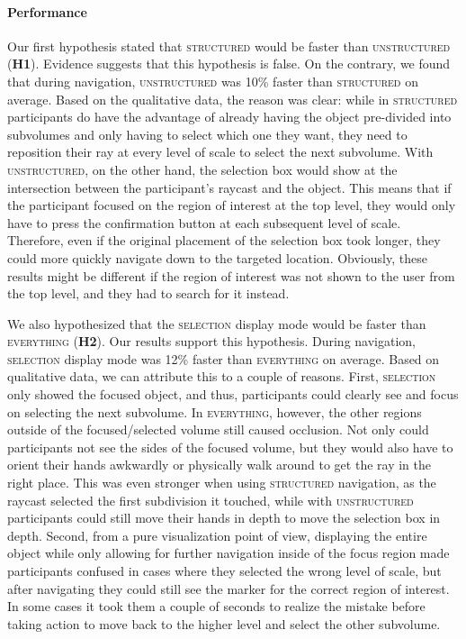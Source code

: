 \paragraph{\textbf{Performance}}
Our first hypothesis stated that \textsc{structured} would be faster than \textsc{unstructured} (\textbf{H1}). Evidence suggests that this hypothesis is false. On the contrary, we found that during navigation, \textsc{unstructured} was 10\% faster than \textsc{structured} on average. Based on the qualitative data, the reason was clear: while in \textsc{structured} participants do have the advantage of already having the object pre-divided into subvolumes and only having to select which one they want, they need to reposition their ray at every level of scale to select the next subvolume. With \textsc{unstructured}, on the other hand, the selection box would show at the intersection between the participant's raycast and the object. This means that if the participant focused on the region of interest at the top level, they would only have to press the confirmation button at each subsequent level of scale. Therefore, even if the original placement of the selection box took longer, they could more quickly navigate down to the targeted location. Obviously, these results might be different if the region of interest was not shown to the user from the top level, and they had to search for it instead.

We also hypothesized that the \textsc{selection} display mode would be faster than \textsc{everything} (\textbf{H2}). Our results support this hypothesis. During navigation, \textsc{selection} display mode was 12\% faster than \textsc{everything} on average. Based on qualitative data, we can attribute this to a couple of reasons. First, \textsc{selection} only showed the focused object, and thus, participants could clearly see and focus on selecting the next subvolume. In \textsc{everything}, however, the other regions outside of the focused/selected volume still caused occlusion. Not only could participants not see the sides of the focused volume, but they would also have to orient their hands awkwardly or physically walk around to get the ray in the right place. This was even stronger when using \textsc{structured} navigation, as the raycast selected the first subdivision it touched, while with \textsc{unstructured} participants could still move their hands in depth to move the selection box in depth. Second, from a pure visualization point of view, displaying the entire object while only allowing for further navigation inside of the focus region made participants confused in cases where they selected the wrong level of scale, but after navigating they could still see the marker for the correct region of interest. In some cases it took them a couple of seconds to realize the mistake before taking action to move back to the higher level and select the other subvolume.

